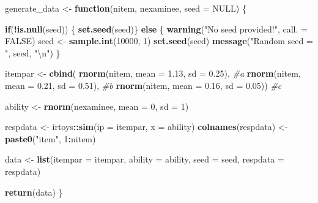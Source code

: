 \documentclass[
]{book}
\newenvironment{Shaded}{\begin{snugshade}}{\end{snugshade}}
\newcommand{\CharTok}[1]{\textcolor[rgb]{0.31,0.60,0.02}{#1}}
\newcommand{\CommentTok}[1]{\textcolor[rgb]{0.56,0.35,0.01}{\textit{#1}}}
\newcommand{\ControlFlowTok}[1]{\textcolor[rgb]{0.13,0.29,0.53}{\textbf{#1}}}
\newcommand{\DataTypeTok}[1]{\textcolor[rgb]{0.13,0.29,0.53}{#1}}
\newcommand{\DecValTok}[1]{\textcolor[rgb]{0.00,0.00,0.81}{#1}}
\newcommand{\FloatTok}[1]{\textcolor[rgb]{0.00,0.00,0.81}{#1}}
\newcommand{\KeywordTok}[1]{\textcolor[rgb]{0.13,0.29,0.53}{\textbf{#1}}}
\newcommand{\NormalTok}[1]{#1}
\newcommand{\OperatorTok}[1]{\textcolor[rgb]{0.81,0.36,0.00}{\textbf{#1}}}
\newcommand{\OtherTok}[1]{\textcolor[rgb]{0.56,0.35,0.01}{#1}}
\newcommand{\StringTok}[1]{\textcolor[rgb]{0.31,0.60,0.02}{#1}}
\begin{document}
\begin{Shaded}
\begin{Highlighting}[]
\NormalTok{generate_data <-}\StringTok{ }\ControlFlowTok{function}\NormalTok{(nitem, nexaminee, }\DataTypeTok{seed =} \OtherTok{NULL}\NormalTok{) \{}
  
  \ControlFlowTok{if}\NormalTok{(}\OperatorTok{!}\KeywordTok{is.null}\NormalTok{(seed)) \{}
    \KeywordTok{set.seed}\NormalTok{(seed)\} }
  \ControlFlowTok{else}\NormalTok{ \{}
    \KeywordTok{warning}\NormalTok{(}\StringTok{"No seed provided!"}\NormalTok{, }\DataTypeTok{call. =} \OtherTok{FALSE}\NormalTok{)}
\NormalTok{    seed <-}\StringTok{ }\KeywordTok{sample.int}\NormalTok{(}\DecValTok{10000}\NormalTok{, }\DecValTok{1}\NormalTok{)}
    \KeywordTok{set.seed}\NormalTok{(seed)}
    \KeywordTok{message}\NormalTok{(}\StringTok{"Random seed = "}\NormalTok{, seed, }\StringTok{"}\CharTok{\textbackslash{}n}\StringTok{"}\NormalTok{)}
\NormalTok{  \}}
  
\NormalTok{  itempar <-}\StringTok{ }\KeywordTok{cbind}\NormalTok{(}
    \KeywordTok{rnorm}\NormalTok{(nitem, }\DataTypeTok{mean =} \FloatTok{1.13}\NormalTok{, }\DataTypeTok{sd =} \FloatTok{0.25}\NormalTok{), }\CommentTok{#a}
    \KeywordTok{rnorm}\NormalTok{(nitem, }\DataTypeTok{mean =} \FloatTok{0.21}\NormalTok{, }\DataTypeTok{sd =} \FloatTok{0.51}\NormalTok{), }\CommentTok{#b}
    \KeywordTok{rnorm}\NormalTok{(nitem, }\DataTypeTok{mean =} \FloatTok{0.16}\NormalTok{, }\DataTypeTok{sd =} \FloatTok{0.05}\NormalTok{)) }\CommentTok{#c}
  
\NormalTok{  ability <-}\StringTok{ }\KeywordTok{rnorm}\NormalTok{(nexaminee, }\DataTypeTok{mean =} \DecValTok{0}\NormalTok{, }\DataTypeTok{sd =} \DecValTok{1}\NormalTok{)}
  
\NormalTok{  respdata <-}\StringTok{ }\NormalTok{irtoys}\OperatorTok{::}\KeywordTok{sim}\NormalTok{(}\DataTypeTok{ip =}\NormalTok{ itempar, }\DataTypeTok{x =}\NormalTok{ ability)}
  \KeywordTok{colnames}\NormalTok{(respdata) <-}\StringTok{ }\KeywordTok{paste0}\NormalTok{(}\StringTok{"item"}\NormalTok{, }\DecValTok{1}\OperatorTok{:}\NormalTok{nitem)}
  
\NormalTok{  data <-}\StringTok{ }\KeywordTok{list}\NormalTok{(}\DataTypeTok{itempar =}\NormalTok{ itempar,}
               \DataTypeTok{ability =}\NormalTok{ ability,}
               \DataTypeTok{seed =}\NormalTok{ seed,}
               \DataTypeTok{respdata =}\NormalTok{ respdata)}
  
  \KeywordTok{return}\NormalTok{(data)}
\NormalTok{\}}
\end{Highlighting}
\end{Shaded}
\end{document}
